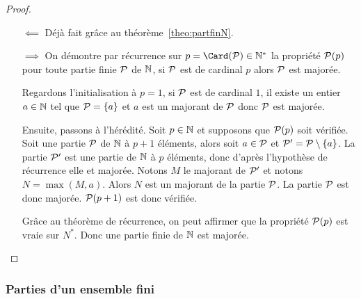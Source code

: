 \begin{proof}
  \begin{itemize}
  \item[$\impliedby$] Déjà fait grâce au théorème~\ref{theo:partfinN}.
  \item[$\implies$] On démontre par récurrence sur $p=\Card(\P)\in \N^*$ la propriété $\P(p)$ pour toute partie finie $\P$ de $\N$, si $\P$ est de cardinal $p$ alors $\P$ est majorée. 

Regardons l'initialisation à $p=1$, si $\P$ est de cardinal $1$, il existe un entier $a\in\N$ tel que $\P=\{a\}$ et $a$ est un majorant de $\P$ donc $\P$ est majorée.

Ensuite, passons à l'hérédité. Soit $p \in \N$ et supposons que $\P(p)$ soit vérifiée. Soit une partie $\P$ de $\N$ à $p+1$ éléments, alors soit $a\in \P$ et $\P'=\P\setminus\{a\}$. La partie $\P'$ est une partie de $\N$ à $p$ éléments, donc d'après l'hypothèse de récurrence elle et majorée. Notons $M$ le majorant de $\P'$ et notons $N=\max(M,a)$. Alors $N$ est un majorant de la partie $\P$. La partie $\P$ est donc majorée. $\P(p+1)$ est donc vérifiée.

Grâce au théorème de récurrence, on peut affirmer que la propriété $\P(p)$ est vraie sur $N^*$. Donc une partie finie de $\N$ est majorée.
  \end{itemize}
\end{proof}

\subsubsection{Parties d'un ensemble fini}


